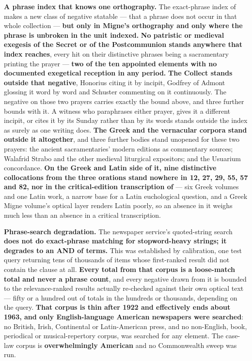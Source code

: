 \textbf{A phrase index that knows one orthography.} The exact-phrase index of
 makes a new class of negative statable --- that a phrase
does not occur in that whole collection --- \textbf{but only in Migne's
orthography and only where the phrase is unbroken in the unit indexed.}
\textbf{No patristic or medieval exegesis of the Secret  or of the Postcommunion  stands
anywhere that index reaches}, every hit on their distinctive phrases being a
sacramentary printing the prayer --- \textbf{two of the ten appointed elements
with no documented exegetical reception in any period.} \textbf{The Collect
stands outside that negative}, Honorius citing it by incipit, Godfrey of Admont
glossing it word by word and Schuster commenting on it continuously. The
negative on those two prayers carries exactly the bound above, and three further
bounds with it. A witness who paraphrases either prayer, gives it a different
incipit, or cites it by its Sunday rather than by its words stands outside the
index as surely as one writing  does. \textbf{The Greek and
the vernacular corpora stand outside it altogether}, and three further bodies
stand unopened for these two prayers: the ancient sacramentaries' modern
editions as commentary sources; Walafrid Strabo and the other medieval
liturgical expositors; and the Usuarium  concordance.
\textbf{On the Greek and Latin side of it, nine distinctive collocations from
the three orations stand nowhere in  12, 27, 29, 55, 57
and 82, nor in the critical-edition transcription of } ---
six Greek volumes and one Latin work, a narrow base for a Latin euchological
question, and a Greek Migne volume's optical layer renders Latin poorly, so an
absence in it weighs much less than an absence in a critical transcription.

\textbf{Phrase-search degradation.} The newspaper service's quoted-string search
\textbf{does not do exact-phrase matching for stopword-heavy strings; it
degrades to an AND of terms.} This was established by calibration, one test
query returning tens of thousands of items whose first-ranked result did not
contain the clause at all. \textbf{Every total from that corpus is a loose-match
total and never a phrase count}, and every negative drawn from it is bounded to
the relevance-ranked results actually re-checked against their own optical text
--- fifty or a hundred out of totals in the hundreds or thousands, depending on
the query. \textbf{That corpus is thin after 1922 and
effectively ends about 1963, and only English-language American newspapers were
searched}: no British, Irish, Continental or Latin-American press, and no
non-English, book, periodical or musical-repertory corpus, was searched for any
element. The case-law corpus is \textbf{overwhelmingly American} and no
Commonwealth sweep was run.

